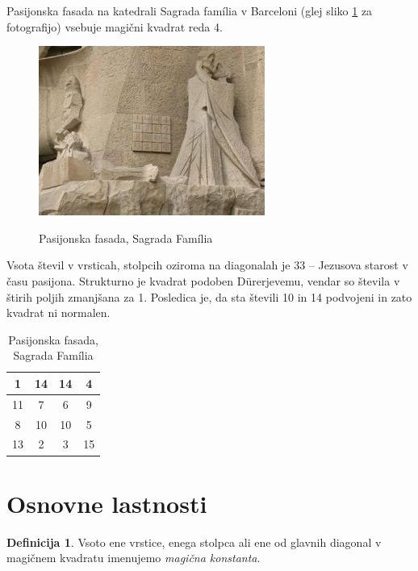 \documentclass[a4paper,12pt]{article}
\theoremstyle{definition}
\newtheorem{definicija}{Definicija}
\theoremstyle{plain}
\newcommand{\pojem}[1]{\emph{\color{purple}#1}}
\newenvironment{magic}[3]{
   \begin{table}[!ht]
   \centering
   \caption{#2}
   \label{#3}
   \large
   \begin{tabular}{|*{#1}{c|}} \hline
}{
 \end{tabular}
   \normalsize
\end{table}  
}
\begin{document}
Pasijonska fasada na katedrali Sagrada família v Barceloni
(glej sliko \ref{fig:sagrada} za fotografijo) vsebuje magični kvadrat reda 4.

\begin{figure}[!ht]
   \centering
   \caption{Pasijonska fasada, Sagrada Família}
\includegraphics{sagrada.png}
\label{fig:sagrada}
\end{figure}

Vsota števil v vrsticah, stolpcih oziroma na diagonalah je 33 -- Jezusova starost
v času pasijona. Strukturno je kvadrat podoben Dürerjevemu, vendar so števila
v štirih poljih zmanjšana za 1. Posledica je, da sta števili 10 in 14 podvojeni
in zato kvadrat ni normalen.
%

\begin{magic}{4}{Pasijonska fasada, Sagrada Família}{table:segrada}
       1 & 14 & 14 &  4 \\\hline
      11 &  7 &  6 &  9 \\\hline
       8 & 10 & 10 &  5 \\\hline
      13 &  2 &  3 & 15 \\\hline
\end{magic}


\section{Osnovne lastnosti}

\begin{definicija}
      Vsoto ene vrstice, enega stolpca ali ene od glavnih diagonal
      v magičnem kvadratu imenujemo \pojem{magična konstanta}.
\end{definicija}
\end{document}
